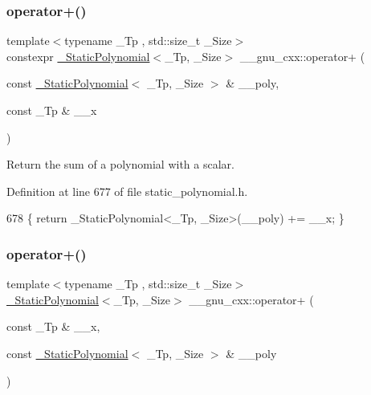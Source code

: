 \subsubsection{\texorpdfstring{operator+()}{operator+()}\hspace{0.1cm}{\footnotesize\ttfamily [1/6]}}
{\footnotesize\ttfamily template$<$typename \+\_\+\+Tp , std\+::size\+\_\+t \+\_\+\+Size$>$ \\
constexpr \hyperlink{class____gnu__cxx_1_1__StaticPolynomial}{\+\_\+\+Static\+Polynomial}$<$\+\_\+\+Tp, \+\_\+\+Size$>$ \+\_\+\+\_\+gnu\+\_\+cxx\+::operator+ (\begin{DoxyParamCaption}\item[{const \hyperlink{class____gnu__cxx_1_1__StaticPolynomial}{\+\_\+\+Static\+Polynomial}$<$ \+\_\+\+Tp, \+\_\+\+Size $>$ \&}]{\+\_\+\+\_\+poly,  }\item[{const \+\_\+\+Tp \&}]{\+\_\+\+\_\+x }\end{DoxyParamCaption})\hspace{0.3cm}{\ttfamily [inline]}}

Return the sum of a polynomial with a scalar. 

Definition at line 677 of file static\+\_\+polynomial.\+h.


\begin{DoxyCode}
678     \{ \textcolor{keywordflow}{return} \_StaticPolynomial<\_Tp, \_Size>(\_\_poly) += \_\_x; \}
\end{DoxyCode}
\mbox{\label{namespace____gnu__cxx_a06334b50d2c25cdadf11c1785a57cde0}} 
\subsubsection{\texorpdfstring{operator+()}{operator+()}\hspace{0.1cm}{\footnotesize\ttfamily [2/6]}}
{\footnotesize\ttfamily template$<$typename \+\_\+\+Tp , std\+::size\+\_\+t \+\_\+\+Size$>$ \\
\hyperlink{class____gnu__cxx_1_1__StaticPolynomial}{\+\_\+\+Static\+Polynomial}$<$\+\_\+\+Tp, \+\_\+\+Size$>$ \+\_\+\+\_\+gnu\+\_\+cxx\+::operator+ (\begin{DoxyParamCaption}\item[{const \+\_\+\+Tp \&}]{\+\_\+\+\_\+x,  }\item[{const \hyperlink{class____gnu__cxx_1_1__StaticPolynomial}{\+\_\+\+Static\+Polynomial}$<$ \+\_\+\+Tp, \+\_\+\+Size $>$ \&}]{\+\_\+\+\_\+poly }\end{DoxyParamCaption})\hspace{0.3cm}{\ttfamily [inline]}}



